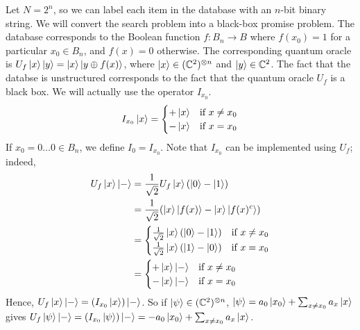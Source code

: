 Let \( N = 2^n \), so we can label each item in the database with an \( n \)-bit binary string.
We will convert the search problem into a black-box promise problem.
The database corresponds to the Boolean function \( f \colon B_n \to B \) where \( f(x_0) = 1 \) for a particular \( x_0 \in B_n \), and \( f(x) = 0 \) otherwise.
The corresponding quantum oracle is \( U_f \ket{x} \ket{y} = \ket{x} \ket{y \oplus f(x)} \), where \( \ket{x} \in (\mathbb C^2)^{\otimes n} \) and \( \ket{y} \in \mathbb C^2 \).
The fact that the databse is unstructured corresponds to the fact that the quantum oracle \( U_f \) is a black box.
We will actually use the operator \( I_{x_0} \).
\[ I_{x_0} \ket{x} = \begin{cases}
    +\ket{x} & \text{if } x \neq x_0 \\
    -\ket{x} & \text{if } x = x_0
\end{cases} \]
If \( x_0 = 0\dots 0 \in B_n \), we define \( I_0 = I_{x_0} \).
Note that \( I_{x_0} \) can be implemented using \( U_f \); indeed,
\begin{align*}
    U_f \ket{x} \ket{-} &= \frac{1}{\sqrt{2}} U_f \ket{x} \qty(\ket{0} - \ket{1}) \\
    &= \frac{1}{\sqrt{2}}\qty(\ket{x} \ket{f(x)} - \ket{x} \ket{f(x)^c}) \\
    &= \begin{cases}
        \frac{1}{\sqrt{2}} \ket{x} \qty(\ket{0} - \ket{1}) & \text{if } x \neq x_0 \\
        \frac{1}{\sqrt{2}} \ket{x} \qty(\ket{1} - \ket{0}) & \text{if } x = x_0
    \end{cases} \\
    &= \begin{cases}
        +\ket{x}\ket{-} & \text{if } x \neq x_0 \\
        -\ket{x}\ket{-} & \text{if } x = x_0
    \end{cases}
\end{align*}
Hence, \( U_f \ket{x} \ket{-} = (I_{x_0} \ket{x})\ket{-} \).
So if \( \ket{\psi} \in (\mathbb C^2)^{\otimes n} \), \( \ket{\psi} = a_0 \ket{x_0} + \sum_{x \neq x_0} a_x \ket{x} \) gives \( U_f \ket{\psi}\ket{-} = (I_{x_0} \ket{\psi}) \ket{-} = -a_0 \ket{x_0} + \sum_{x \neq x_0} a_x \ket{x} \).

